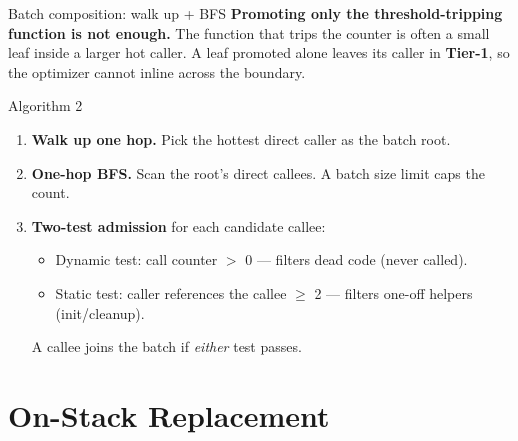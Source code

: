 \documentclass[aspectratio=169,11pt]{beamer}
\newcommand{\tone}{\textbf{\textcolor{tier1}{Tier-1}}}
\begin{document}
\begin{frame}{Batch composition: walk up + BFS}
  \textbf{Promoting only the threshold-tripping function is not enough.}
  The function that trips the counter is often a small leaf inside a larger hot caller.
  A leaf promoted alone leaves its caller in \tone{}, so the optimizer cannot inline across the boundary.
  \vspace{0.3em}
  \begin{block}{Algorithm 2}
    \begin{enumerate}\setlength{\itemsep}{1pt}
      \item \textbf{Walk up one hop.} Pick the hottest direct caller as the batch root.
      \item \textbf{One-hop BFS.} Scan the root's direct callees. A batch size limit caps the count.
      \item \textbf{Two-test admission} for each candidate callee:
        \begin{itemize}\setlength{\itemsep}{0pt}
          \item Dynamic test: call counter $>$ 0 --- filters dead code (never called).
          \item Static test: caller references the callee $\geq$ 2 --- filters one-off helpers (init/cleanup).
        \end{itemize}
        A callee joins the batch if \emph{either} test passes.
    \end{enumerate}
  \end{block}
\end{frame}

\section{On-Stack Replacement}
\end{document}
